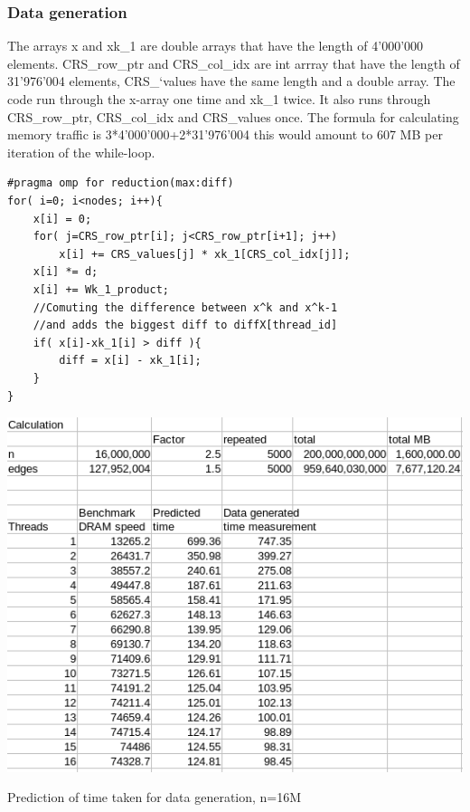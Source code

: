 \documentclass[12pt,a4paper,USenglish]{article}      %
\begin{document}
\subsubsection{Data generation}
The arrays x and xk\_1 are double arrays that have the length of 4'000'000 elements. CRS\_row\_ptr and CRS\_col\_idx are int arrray that have the length of 31'976'004 elements, CRS\_`values have the same length and a double array.
The code run through the x-array one time and xk\_1 twice. It also runs through CRS\_row\_ptr, CRS\_col\_idx and CRS\_values once. The formula for calculating memory traffic is 3*4'000'000+2*31'976'004 this would amount to 607 MB per iteration of the while-loop. 


\begin{lstlisting}[caption=Generation of data.]
#pragma omp for reduction(max:diff)
for( i=0; i<nodes; i++){
	x[i] = 0;
	for( j=CRS_row_ptr[i]; j<CRS_row_ptr[i+1]; j++)
		x[i] += CRS_values[j] * xk_1[CRS_col_idx[j]];
	x[i] *= d;
	x[i] += Wk_1_product;
	//Comuting the difference between x^k and x^k-1
	//and adds the biggest diff to diffX[thread_id]
	if( x[i]-xk_1[i] > diff ){
		diff = x[i] - xk_1[i];
	}
}
\end{lstlisting}

\begin{table}[!hbtp]
\includegraphics[scale=0.7]{DRAM_only_DataGeneration_16M.png}
\caption{Prediction of time taken for data generation, n=16M}
\end{table}

\clearpage
\end{document}
